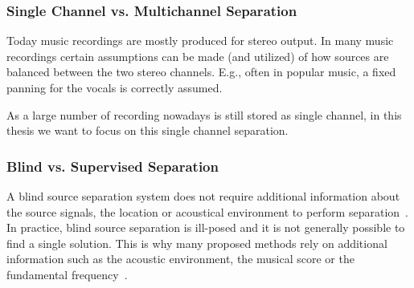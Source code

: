 \subsubsection*{Single Channel vs. Multichannel Separation}
Today music recordings are mostly produced for stereo output. 
In many music recordings certain assumptions can be made (and utilized) of how sources are balanced between the two stereo channels. 
E.g., often in popular music, a fixed panning for the vocals is correctly assumed.
\par
As a large number of recording nowadays is still stored as single channel, in this thesis we want to focus on this single channel separation.

\subsubsection*{Blind vs. Supervised Separation}
A blind source separation system does not require additional information about the source signals, the location or acoustical environment to perform separation~\cite{makino07}.
In practice, blind source separation is ill-posed and it is not generally possible to find a single solution.
This is why many proposed methods rely on additional information such as the acoustic environment, the musical score or the fundamental frequency~\cite{liutkus13, ewert14}.

